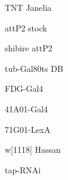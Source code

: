 \documentclass[17pt]{extarticle}
\begin{document}
\newpage{}
\vspace*{\fill}\begin{normalsize}
TNT Janelia \\[0.5em]
\end{normalsize}
\footnotesize
\vspace*{\fill}
\newpage{}
\vspace*{\fill}\begin{normalsize}
attP2 stock \\[0.5em]
\end{normalsize}
\footnotesize
\vspace*{\fill}
\newpage{}
\vspace*{\fill}\begin{normalsize}
shibire attP2 \\[0.5em]
\end{normalsize}
\footnotesize
\vspace*{\fill}
\newpage{}
\vspace*{\fill}\begin{normalsize}
tub-Gal80ts DB \\[0.5em]
\end{normalsize}
\footnotesize
\vspace*{\fill}
\newpage{}
\vspace*{\fill}\begin{large}
FDG-Gal4 \\[0.5em]
\end{large}
\footnotesize
\vspace*{\fill}
\newpage{}
\vspace*{\fill}\begin{large}
41A01-Gal4 \\[0.5em]
\end{large}
\footnotesize
\vspace*{\fill}
\newpage{}
\vspace*{\fill}\begin{large}
71G01-LexA \\[0.5em]
\end{large}
\footnotesize
\vspace*{\fill}
\newpage{}
\vspace*{\fill}\begin{normalsize}
w[1118] Hassan \\[0.5em]
\end{normalsize}
\footnotesize
\vspace*{\fill}
\newpage{}
\vspace*{\fill}\begin{large}
tap-RNAi \\[0.5em]
\end{large}
\end{document}
